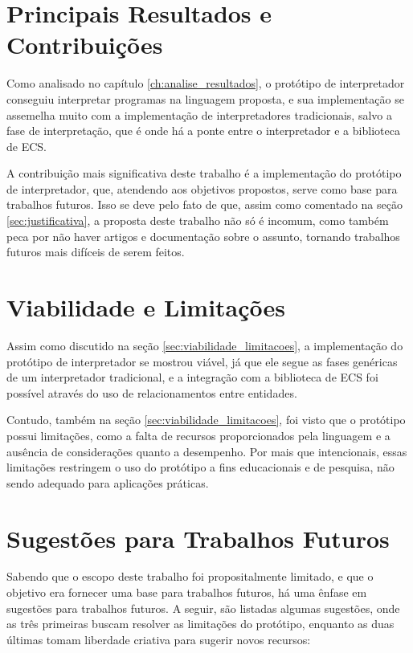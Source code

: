 \section{Principais Resultados e Contribuições}

Como analisado no capítulo \ref{ch:analise_resultados}, o protótipo de interpretador conseguiu interpretar programas na linguagem proposta, e sua implementação se assemelha muito com a implementação de interpretadores tradicionais, salvo a fase de interpretação, que é onde há a ponte entre o interpretador e a biblioteca de ECS.

A contribuição mais significativa deste trabalho é a implementação do protótipo de interpretador, que, atendendo aos objetivos propostos, serve como base para trabalhos futuros. Isso se deve pelo fato de que, assim como comentado na seção \ref{sec:justificativa}, a proposta deste trabalho não só é incomum, como também peca por não haver artigos e documentação sobre o assunto, tornando trabalhos futuros mais difíceis de serem feitos.

\section{Viabilidade e Limitações}

Assim como discutido na seção \ref{sec:viabilidade_limitacoes}, a implementação do protótipo de interpretador se mostrou viável, já que ele segue as fases genéricas de um interpretador tradicional, e a integração com a biblioteca de ECS foi possível através do uso de relacionamentos entre entidades.

Contudo, também na seção \ref{sec:viabilidade_limitacoes}, foi visto que o protótipo possui limitações, como a falta de recursos proporcionados pela linguagem e a ausência de considerações quanto a desempenho. Por mais que intencionais, essas limitações restringem o uso do protótipo a fins educacionais e de pesquisa, não sendo adequado para aplicações práticas.

\section{Sugestões para Trabalhos Futuros}

Sabendo que o escopo deste trabalho foi propositalmente limitado, e que o objetivo era fornecer uma base para trabalhos futuros, há uma ênfase em sugestões para trabalhos futuros. A seguir, são listadas algumas sugestões, onde as três primeiras buscam resolver as limitações do protótipo, enquanto as duas últimas tomam liberdade criativa para sugerir novos recursos:

